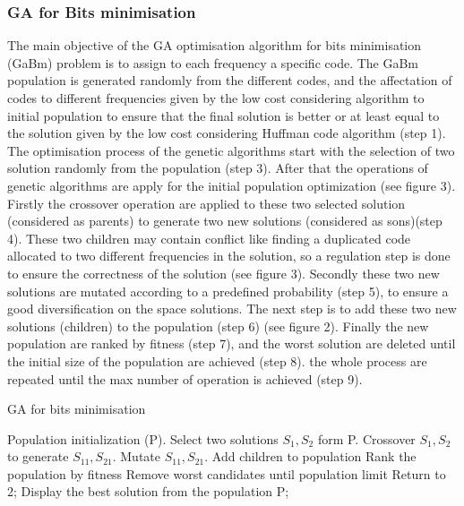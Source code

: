 \documentclass[preprint,12pt]{elsarticle}
\begin{document}
\subsubsection{GA for Bits minimisation}
The main objective of the GA optimisation algorithm for bits minimisation (GaBm) problem is to assign to each frequency a specific code. The GaBm population is generated randomly from the different codes, and the affectation of codes to different frequencies given by the low cost considering  algorithm  to initial population to ensure that the final solution is better or at least equal to the solution given by the low cost considering Huffman code algorithm (step 1). The optimisation process of the genetic algorithms start with the selection of two solution randomly from the population (step 3). After that the operations of genetic algorithms are apply for the initial population optimization (see figure 3). Firstly the crossover operation are applied to these two selected  solution (considered as parents) to generate two new solutions (considered as sons)(step 4). These two children may contain conflict like finding a duplicated code allocated to two different frequencies in the solution, so a regulation step is done to ensure the correctness of the solution (see figure 3). Secondly these two new solutions are mutated according to a predefined probability (step 5), to ensure a good diversification on the space solutions. The next step is to add these two new solutions (children) to the population (step 6) (see figure 2). Finally the new population are ranked by fitness (step 7), and the worst solution are deleted until the initial size of the population are achieved  (step 8). the whole process are repeated until the max number of operation is achieved (step 9). 
\begin{algorithm}
\caption{GA for bits minimisation}
\begin{algorithmic}[1]
\State Population initialization (P).
\State Select two solutions $S_{1},S_{2}$ form P.
\State Crossover $S_{1},S_{2}$ to generate $S_{11},S_{21}$.
\State Mutate $S_{11},S_{21}$.
\State Add children to population
\State Rank the population by fitness
\State Remove worst candidates until population limit
\State Return to 2;
\EndWhile
\State Display the best solution from the population P;
\end{algorithmic}
\end{algorithm}
\end{document}
